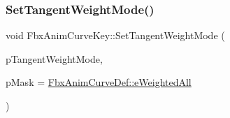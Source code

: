\subsubsection{\texorpdfstring{Set\+Tangent\+Weight\+Mode()}{SetTangentWeightMode()}}
{\footnotesize\ttfamily void Fbx\+Anim\+Curve\+Key\+::\+Set\+Tangent\+Weight\+Mode (\begin{DoxyParamCaption}\item[{\hyperlink{class_fbx_anim_curve_def_aeee6e9cc12501e10dbd3e5caaf66990e}{Fbx\+Anim\+Curve\+Def\+::\+E\+Weighted\+Mode}}]{p\+Tangent\+Weight\+Mode,  }\item[{\hyperlink{class_fbx_anim_curve_def_aeee6e9cc12501e10dbd3e5caaf66990e}{Fbx\+Anim\+Curve\+Def\+::\+E\+Weighted\+Mode}}]{p\+Mask = {\ttfamily \hyperlink{class_fbx_anim_curve_def_aeee6e9cc12501e10dbd3e5caaf66990ea4337e6853fab642c2a432ab1bb303922}{Fbx\+Anim\+Curve\+Def\+::e\+Weighted\+All}} }\end{DoxyParamCaption})}

